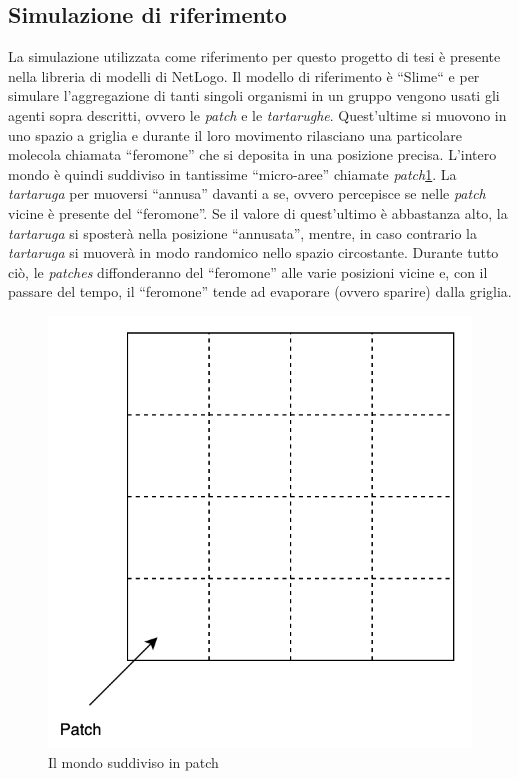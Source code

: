 \subsection{Simulazione di riferimento}\label{refSim}
La simulazione utilizzata come riferimento per questo progetto di tesi è presente nella libreria
di modelli di NetLogo. Il modello di riferimento è ``Slime``\space\cite{wilensky1997netlogo}
e per simulare l'aggregazione di tanti singoli organismi in un gruppo vengono usati gli agenti sopra descritti, 
ovvero le \textit{patch} e le \textit{tartarughe}.
Quest'ultime si muovono in uno spazio a griglia e durante il loro movimento rilasciano una particolare molecola
chiamata ``feromone'' che si deposita in una posizione precisa. L'intero mondo è quindi suddiviso
in tantissime ``micro-aree'' chiamate \textit{patch}\space\cref{fig:patch}. La \textit{tartaruga} per muoversi 
``annusa'' davanti a se, ovvero percepisce se nelle \textit{patch} vicine è presente del ``feromone''. Se il valore di quest'ultimo è abbastanza alto, la 
\textit{tartaruga} si sposterà nella posizione ``annusata'', mentre, in caso contrario la \textit{tartaruga} si muoverà in modo randomico nello spazio circostante. 
Durante tutto ciò, le \textit{patches} diffonderanno del ``feromone'' alle varie posizioni vicine e, con il passare del tempo,
il ``feromone'' tende ad evaporare (ovvero sparire) dalla griglia.
\begin{figure}[ht]
    \centering
    \includegraphics[scale=0.6]{figures/patch.png}
    \caption{Il mondo suddiviso in patch}\label{fig:patch}
\end{figure}

